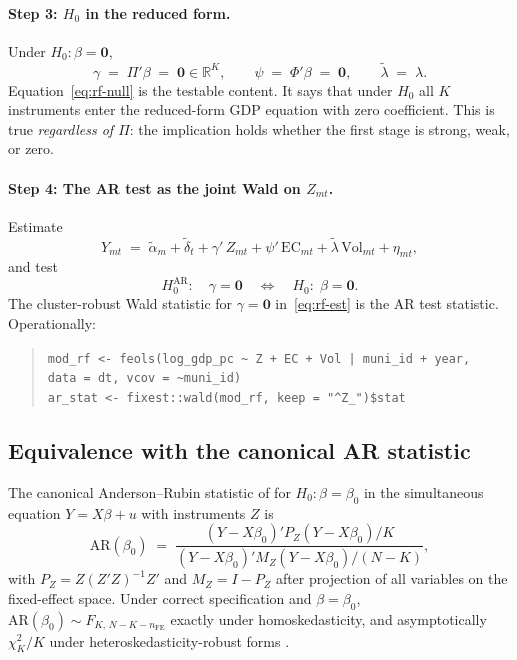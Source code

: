 \documentclass{article}
\newcommand{\EC}{\mathrm{EC}}
\newcommand{\Vol}{\mathrm{Vol}}
\newcommand{\bzero}{\mathbf{0}}
\theoremstyle{plain}
\theoremstyle{definition}
\theoremstyle{remark}
\begin{document}
\paragraph{Step 3: $H_0$ in the reduced form.}
Under $H_{0}:\beta=\bzero$,
\begin{equation}\label{eq:rf-null}
  \gamma \;=\; \Pi'\beta \;=\; \bzero \in \mathbb{R}^{K},
  \qquad
  \psi \;=\; \Phi'\beta \;=\; \bzero,
  \qquad
  \tilde\lambda \;=\; \lambda.
\end{equation}
Equation~\eqref{eq:rf-null} is the testable content. It says that under
$H_0$ all $K$ instruments enter the reduced-form GDP equation with zero
coefficient. This is true \emph{regardless of $\Pi$}: the implication holds
whether the first stage is strong, weak, or zero.

\paragraph{Step 4: The AR test as the joint Wald on $Z_{mt}$.}
Estimate
\begin{equation}\label{eq:rf-est}
  Y_{mt}
  \;=\;
  \tilde\alpha_m + \tilde\delta_t
  + \gamma'\,Z_{mt}
  + \psi'\,\EC_{mt}
  + \tilde\lambda\,\Vol_{mt}
  + \eta_{mt},
\end{equation}
and test
\begin{equation}\label{eq:wald}
  H_{0}^{\mathrm{AR}}:\quad \gamma = \bzero \quad\Longleftrightarrow\quad H_0:\;\beta=\bzero.
\end{equation}
The cluster-robust Wald statistic for $\gamma=\bzero$ in~\eqref{eq:rf-est} is
the AR test statistic. Operationally:
\begin{quote}
\texttt{mod\_rf <- feols(log\_gdp\_pc \textasciitilde{} Z + EC + Vol \texttt{|} muni\_id + year,\\
\hphantom{mod\_rf <- }data = dt, vcov = \textasciitilde muni\_id)}\\
\texttt{ar\_stat <- fixest::wald(mod\_rf, keep = "\textasciicircum Z\_")\$stat}
\end{quote}

\subsection{Equivalence with the canonical AR statistic}

The canonical Anderson--Rubin statistic of \citet{anderson1949estimation} for
$H_0:\beta=\beta_0$ in the simultaneous equation $Y=X\beta+u$ with instruments
$Z$ is
\begin{equation}\label{eq:canonical-ar}
  \mathrm{AR}(\beta_0)
  \;=\;
  \frac{(Y - X\beta_0)' P_Z (Y - X\beta_0)/K}
       {(Y - X\beta_0)' M_Z (Y - X\beta_0)/(N-K)},
\end{equation}
with $P_Z=Z(Z'Z)^{-1}Z'$ and $M_Z=I-P_Z$ after projection of all variables on
the fixed-effect space. Under correct specification and $\beta=\beta_0$,
$\mathrm{AR}(\beta_0)\sim F_{K,\,N-K-n_{\mathrm{FE}}}$ exactly under
homoskedasticity, and asymptotically $\chi^2_K/K$ under
heteroskedasticity-robust forms \citep{andrews2019weak,kleibergen2002pivotal}.
\end{document}
